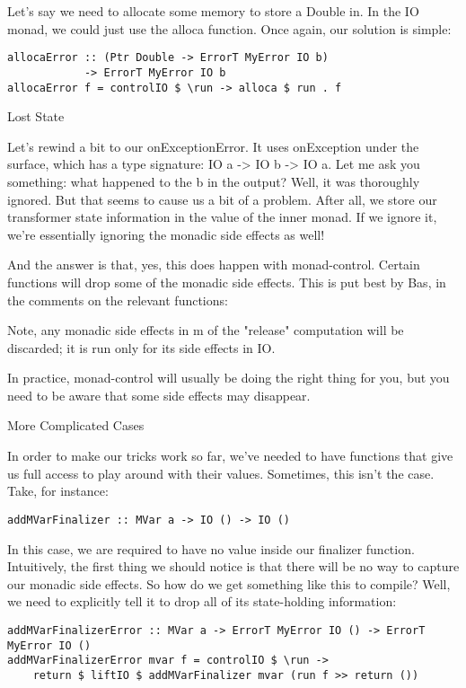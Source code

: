 Let's say we need to allocate some memory to store a Double in. In the IO monad, we could just use the alloca function. Once again, our solution is simple:

\begin{lstlisting}
allocaError :: (Ptr Double -> ErrorT MyError IO b)
            -> ErrorT MyError IO b
allocaError f = controlIO $ \run -> alloca $ run . f
\end{lstlisting}

Lost State

Let's rewind a bit to our onExceptionError. It uses onException under the surface, which has a type signature: IO a -> IO b -> IO a. Let me ask you something: what happened to the b in the output? Well, it was thoroughly ignored. But that seems to cause us a bit of a problem. After all, we store our transformer state information in the value of the inner monad. If we ignore it, we're essentially ignoring the monadic side effects as well!

And the answer is that, yes, this does happen with monad-control. Certain functions will drop some of the monadic side effects. This is put best by Bas, in the comments on the relevant functions:

Note, any monadic side effects in m of the "release" computation will be discarded; it is run only for its side effects in IO.

In practice, monad-control will usually be doing the right thing for you, but you need to be aware that some side effects may disappear.

More Complicated Cases

In order to make our tricks work so far, we've needed to have functions that give us full access to play around with their values. Sometimes, this isn't the case. Take, for instance:

\begin{lstlisting}
addMVarFinalizer :: MVar a -> IO () -> IO ()
\end{lstlisting}

In this case, we are required to have no value inside our finalizer function. Intuitively, the first thing we should notice is that there will be no way to capture our monadic side effects. So how do we get something like this to compile? Well, we need to explicitly tell it to drop all of its state-holding information:

\begin{lstlisting}
addMVarFinalizerError :: MVar a -> ErrorT MyError IO () -> ErrorT MyError IO ()
addMVarFinalizerError mvar f = controlIO $ \run ->
    return $ liftIO $ addMVarFinalizer mvar (run f >> return ())
\end{lstlisting}

